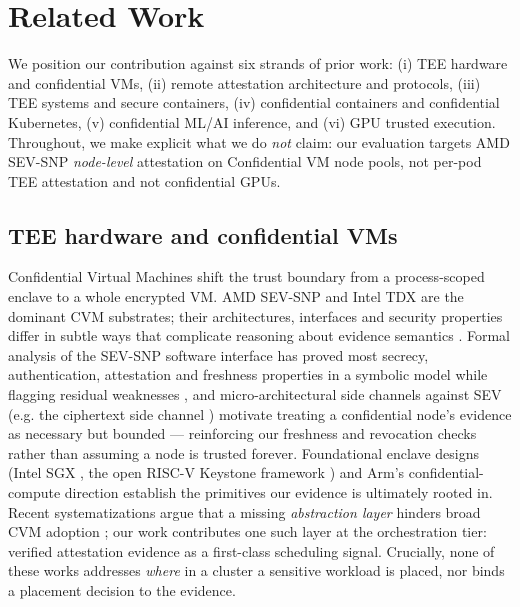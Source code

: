 %

\section{Related Work}
\label{sec:related}

We position our contribution against six strands of prior work: (i) TEE hardware
and confidential VMs, (ii) remote attestation architecture and protocols,
(iii) TEE systems and secure containers, (iv) confidential containers and
confidential Kubernetes, (v) confidential ML/AI inference, and (vi) GPU trusted
execution. Throughout, we make explicit what we do \emph{not} claim: our
evaluation targets AMD SEV-SNP \emph{node-level} attestation on Confidential VM
node pools, not per-pod TEE attestation and not confidential GPUs.

\subsection{TEE hardware and confidential VMs}
Confidential Virtual Machines shift the trust boundary from a process-scoped
enclave to a whole encrypted VM. AMD SEV-SNP and Intel TDX are the dominant CVM
substrates; their architectures, interfaces and security properties differ in
subtle ways that complicate reasoning about evidence semantics
\cite{misono2024cvms,cheng2023tdx}. Formal analysis of the SEV-SNP software
interface has proved most secrecy, authentication, attestation and freshness
properties in a symbolic model while flagging residual weaknesses
\cite{paradzik2024sevsnp}, and micro-architectural side channels against SEV
(e.g. the ciphertext side channel \cite{li2021cipherleaks}) motivate treating a
confidential node's evidence as necessary but bounded --- reinforcing our
freshness and revocation checks rather than assuming a node is trusted forever. Foundational enclave designs (Intel SGX
\cite{costan2016sgx}, the open RISC-V Keystone framework \cite{lee2020keystone})
and Arm's confidential-compute direction \cite{xu2023virtcca,cerdeira2022rezone}
establish the primitives our evidence is ultimately rooted in. Recent
systematizations argue that a missing \emph{abstraction layer} hinders broad CVM
adoption \cite{michaud2025teesok}; our work contributes one such layer at the
orchestration tier: verified attestation evidence as a first-class scheduling
signal. Crucially, none of these works addresses \emph{where} in a cluster a
sensitive workload is placed, nor binds a placement decision to the evidence.

